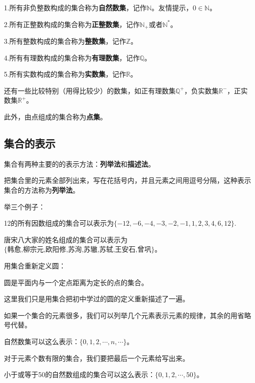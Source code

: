 \documentclass[lang=cn,math=cm,chinesefont=nofont,11pt,scheme=chinese,onecol]{elegantbook}
\begin{document}
1.所有非负整数构成的集合称为\textbf{自然数集}，记作$\mathbb{N}$。友情提示，$0\in \mathbb{N}$。

2.所有正整数构成的集合称为\textbf{正整数集}，记作$\mathbb{N}_+$或者$\mathbb{N}^*$。

3.所有整数构成的集合称为\textbf{整数集}，记作$\mathbb{Z}$。

4.所有有理数构成的集合称为\textbf{有理数集}，记作$\mathbb{Q}$。

5.所有实数构成的集合称为\textbf{实数集}，记作$\mathbb{R}$。

还有一些比较特别（用得比较少）的数集，如正有理数集$\mathbb{Q}^+$，负实数集$\mathbb{R}^-$，正实数集$\mathbb{R}^+$。

此外，由点组成的集合称为\textbf{点集}。

\subsection{集合的表示}
集合有两种主要的的表示方法：\textbf{列举法}和\textbf{描述法}。

把集合里的元素全部列出来，写在花括号内，并且元素之间用逗号分隔，这种表示集合的方法称为\textbf{列举法}。

举三个例子：

\begin{example}
  12的所有因数组成的集合可以表示为$\{-12,-6,-4,-3,-2,-1,1,2,3,4,6,12\}$.
\end{example}
\begin{example}
  唐宋八大家的姓名组成的集合可以表示为$\{\text{韩愈,柳宗元,欧阳修,苏洵,苏辙,苏轼,王安石,曾巩}\}$。
\end{example}
\begin{example}
  用集合重新定义圆：
\end{example}
\begin{definition}[圆]
  圆是平面内与一个定点距离为定长的点的集合。
\end{definition}
这里我们只是用集合把初中学过的圆的定义重新描述了一遍。

如果一个集合的元素很多，我们可以列举几个元素表示元素的规律，其余的用省略号代替。

\begin{example}
  自然数集可以这么表示：$\{0,1,2,\cdots,n,\cdots\}$。
\end{example}

对于元素个数有限的集合，我们要把最后一个元素给写出来。
\begin{example}
  小于或等于50的自然数组成的集合可以这么表示：$\{0,1,2,\cdots,50\}$。
\end{example}
\end{document}
